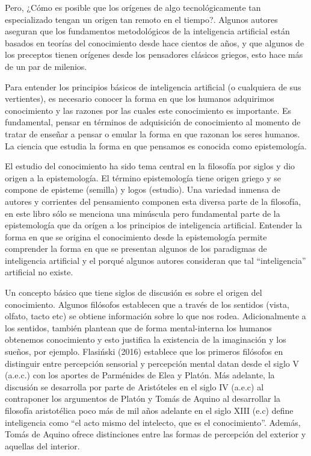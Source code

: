 \documentclass[letterpaper,12pt, spanish, oneside]{book} %
\begin{document}
Pero, ¿Cómo es posible que los orígenes de algo tecnológicamente tan especializado tengan un origen tan remoto en el tiempo?. Algunos autores aseguran que los fundamentos metodológicos de la inteligencia artificial están basados en teorías del conocimiento desde hace cientos de años, y que  algunos de los preceptos tienen orígenes desde los pensadores clásicos griegos, esto hace más de un par de milenios. 

Para entender los principios básicos de inteligencia artificial (o cualquiera de sus vertientes), es necesario conocer la forma en que los humanos adquirimos conocimiento y las razones por las cuales este conocimiento es importante. Es fundamental, pensar en términos de adquisición de conocimiento al momento de tratar de enseñar a pensar o emular la forma en que razonan los seres humanos. La ciencia que estudia la forma en que pensamos es conocida como epistemología.

El estudio del conocimiento ha sido tema central en la filosofía por siglos y dio origen a la epistemología. El término epistemología tiene origen griego y se compone de episteme (semilla) y logos (estudio). Una variedad inmensa de autores y corrientes del pensamiento componen esta diversa parte de la filosofía, en este libro sólo se menciona una minúscula pero fundamental parte de la epistemología que da orígen a los principios de inteligencia artificial. Entender la forma en que se origina el conocimiento desde la epistemología permite comprender la forma en que se presentan algunos de los paradigmas de inteligencia artificial y el porqué algunos autores consideran que tal “inteligencia” artificial no existe.

Un concepto básico que tiene siglos de discusión es sobre el origen del conocimiento. Algunos filósofos establecen que a través de los sentidos (vista, olfato, tacto etc) se obtiene información sobre lo que nos rodea. Adicionalmente a los sentidos, también plantean que de forma mental-interna los humanos obtenemos conocimiento y esto justifica la existencia de la imaginación y los sueños, por ejemplo. Flasiński (2016) establece que los primeros filósofos en distinguir entre percepción sensorial y percepción mental datan desde el siglo V (a.e.c.) con los aportes de Parménides de Elea y Platón. Más adelante, la discusión se desarrolla por parte de Aristóteles en el siglo IV (a.e.c) al contraponer los argumentos de Platón y Tomás de Aquino al desarrollar la filosofía aristotélica poco más de mil años adelante en el siglo XIII (e.c) define inteligencia como “el acto mismo del intelecto, que es el conocimiento”. Además, Tomás de Aquino ofrece distinciones entre las formas de percepción del exterior y aquellas del interior. 
\end{document}
